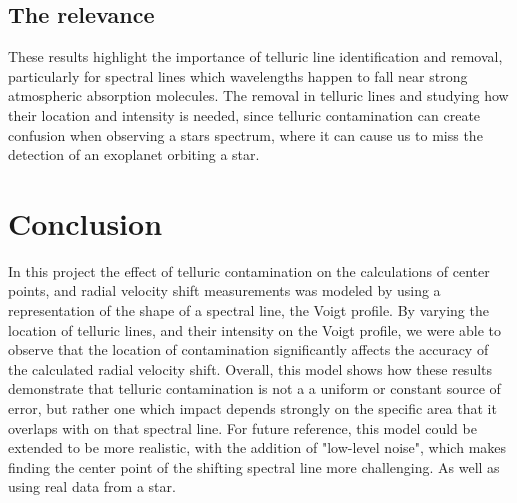\documentclass[aps,onecolumn,12pt,letterpaper,amsmath,amssymb,floatfix,pra,notitlepage]
{revtex4-1}
\begin{document}
\subsection{The relevance}
These results highlight the importance of telluric line identification and removal, particularly for spectral lines which wavelengths happen to fall near strong atmospheric absorption molecules. The removal in telluric lines and studying how their location and intensity is needed, since telluric contamination can create confusion when observing a stars spectrum, where it can cause us to miss the detection of an exoplanet orbiting a star. 

\section{Conclusion} \label{sec:conc}
In this project the effect of telluric contamination on the calculations of center points, and radial velocity shift measurements was modeled by using a representation of the shape of a spectral line, the Voigt profile. By varying the location of telluric lines, and their intensity on the Voigt profile, we were able to observe that the location of contamination significantly affects the accuracy of the calculated radial velocity shift. Overall, this model shows how these results demonstrate that telluric contamination is not a a uniform or constant source of error, but rather one which impact depends strongly on the specific area that it overlaps with on that spectral line. 
For future reference, this model could be extended to be more realistic, with the addition of "low-level noise", which makes finding the center point of the shifting spectral line more challenging. As well as using real data from a star. 



\end{document}

